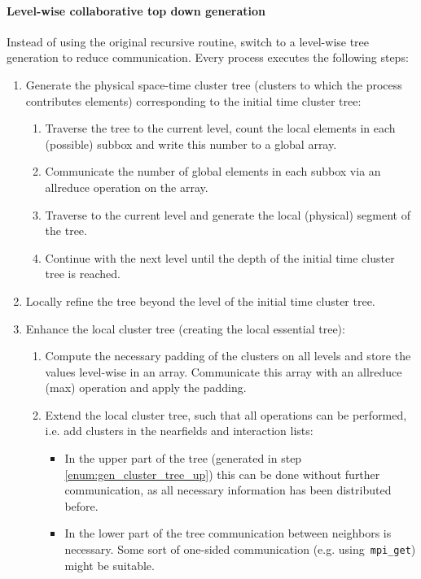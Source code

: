 \documentclass[a4paper,11pt]{article}
\theoremstyle{plain}
\theoremstyle{definition}
\theoremstyle{remark}
\begin{document}
\paragraph{Level-wise collaborative top down generation}
Instead of using the original recursive routine, switch to a level-wise tree generation to reduce communication. Every process executes the following steps: 
\begin{enumerate}
  \item Generate the physical space-time cluster tree (clusters to which the process contributes elements) 
  corresponding to the initial time cluster tree: \label{enum:gen_cluster_tree_up}
  \begin{enumerate}
    \item Traverse the tree to the current level, count the local elements in each (possible) subbox and write this 
    number to a global array.
    \item Communicate the number of global elements in each subbox via an allreduce operation on the array.
    \item Traverse to the current level and generate the local (physical) segment of the tree.
    \item Continue with the next level until the depth of the initial time cluster tree is reached.
  \end{enumerate}

  \item Locally refine the tree beyond the level of the initial time cluster tree. 
  
  \item Enhance the local cluster tree (creating the local essential tree):
  \begin{enumerate}
    \item Compute the necessary padding of the clusters on all levels and store the values level-wise in an array. 
    Communicate this array with an allreduce (max) operation and apply the padding.
    \item Extend the local cluster tree, such that all operations can be performed, i.e. add clusters in the 
    nearfields and interaction lists:
    \begin{itemize}
      \item In the upper part of the tree (generated in step \ref{enum:gen_cluster_tree_up}) this can be done without 
      further communication, as all necessary information has been distributed before.
      \item In the lower part of the tree communication between neighbors is necessary. Some sort of one-sided 
      communication (e.g. using~\texttt{mpi\_get}) might be suitable. 
    \end{itemize}
  \end{enumerate}
\end{enumerate}
\end{document}
